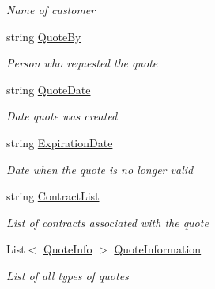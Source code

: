 \begin{DoxyCompactItemize}
\begin{DoxyCompactList}\small\item\em Name of customer \end{DoxyCompactList}\item 
string \mbox{\hyperlink{class_g_f_s_c_1_1_services_1_1_end_of_term_1_1_quote_details_ade4dbc337eeb5c4ae90fca9967f4d8d9}{Quote\+By}}
\begin{DoxyCompactList}\small\item\em Person who requested the quote \end{DoxyCompactList}\item 
string \mbox{\hyperlink{class_g_f_s_c_1_1_services_1_1_end_of_term_1_1_quote_details_a6151312aa5ef14230bf8353bc296988a}{Quote\+Date}}
\begin{DoxyCompactList}\small\item\em Date quote was created \end{DoxyCompactList}\item 
string \mbox{\hyperlink{class_g_f_s_c_1_1_services_1_1_end_of_term_1_1_quote_details_ae66fe43ddf65b0c3f84c3038e730fcb3}{Expiration\+Date}}
\begin{DoxyCompactList}\small\item\em Date when the quote is no longer valid \end{DoxyCompactList}\item 
string \mbox{\hyperlink{class_g_f_s_c_1_1_services_1_1_end_of_term_1_1_quote_details_a12391fe474b254b47c39200d5c948612}{Contract\+List}}
\begin{DoxyCompactList}\small\item\em List of contracts associated with the quote \end{DoxyCompactList}\item 
List$<$ \mbox{\hyperlink{class_g_f_s_c_1_1_services_1_1_end_of_term_1_1_quote_info}{Quote\+Info}} $>$ \mbox{\hyperlink{class_g_f_s_c_1_1_services_1_1_end_of_term_1_1_quote_details_a6e74b7754975f5d1b9c469a8ea50e2d5}{Quote\+Information}}
\begin{DoxyCompactList}\small\item\em List of all types of quotes \end{DoxyCompactList}\item 

\end{DoxyCompactItemize}
